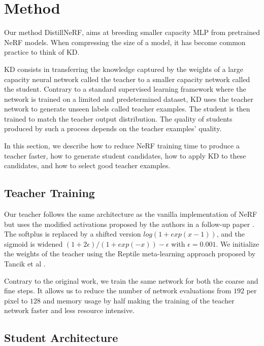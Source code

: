 \glsresetall
\section{Method}

Our method DistillNeRF, aims at breeding smaller capacity \gls{MLP} from pretrained \gls{NeRF} models. When compressing the size of a model, it has become common practice to think of \gls{KD}.

\gls{KD} consists in transferring the knowledge captured by the weights of a large capacity neural network called the teacher to a smaller capacity network called the student. Contrary to a standard supervised learning framework where the network is trained on a limited and predetermined dataset, \gls{KD} uses the teacher network to generate unseen labels called teacher examples. The student is then trained to match the teacher output distribution. The quality of students produced by such a process depends on the teacher examples' quality.

In this section, we describe how to reduce \gls{NeRF} training time to produce a teacher faster, how to generate student candidates, how to apply \gls{KD} to these candidates, and how to select good teacher examples.

\subsection{Teacher Training}

Our teacher follows the same architecture as the vanilla implementation of \gls{NeRF} but uses the modified activations proposed by the authors in a follow-up paper . The softplus is replaced by a shifted version $log(1+exp(x-1))$, and the sigmoid is widened $(1+2\epsilon)/(1+exp(-x))-\epsilon$ with $\epsilon=0.001$. We initialize the weights of the teacher using the Reptile meta-learning approach proposed by Tancik et al .

Contrary to the original work, we train the same network for both the coarse and fine steps. It allows us to reduce the number of network evaluations from $192$ per pixel to $128$ and memory usage by half making the training of the teacher network faster and less resource intensive.

\subsection{Student Architecture}

